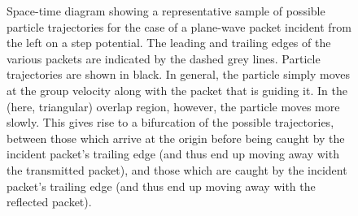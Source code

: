 \documentclass[aps,prc,twocolumn,letterpaper,floatfix]{revtex4}
\begin{document}
\begin{figure}[t]
\begin{center}
\caption{
Space-time diagram showing a
representative sample of possible particle trajectories for the case
of a plane-wave packet incident from the left on a step potential.
The leading and trailing edges of the various packets are indicated by
the dashed grey lines.  Particle trajectories are shown in black.  In 
general, the particle simply moves at the group velocity along with
the packet that is guiding it.  In the (here, triangular) overlap
region, however, the particle moves more slowly.  This gives rise to a
bifurcation of the possible trajectories, between those which arrive at the
origin before being caught by the incident packet's trailing edge
(and thus end up moving away with the transmitted packet), and those
which are caught by the incident packet's trailing edge (and thus end
up moving away with the reflected packet).  
\label{fig2}
}
\end{center}
\end{figure}
\end{document}
